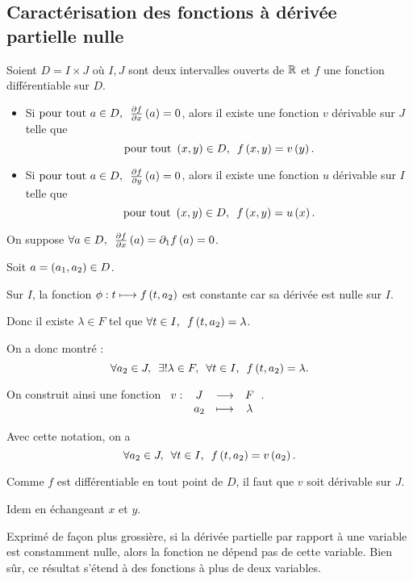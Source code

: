 \subsection{Caractérisation des fonctions à dérivée partielle nulle}

\begin{prop}
Soient \(D=I\times J\) où \(I,J\) sont deux intervalles ouverts de \(\mathbb{R}\) et \(f\) une fonction différentiable sur \(D\).

\begin{itemize}
    \item Si \(\quantifs{\tpt a\in D}\pdv{f}{x}\paren{a}=0\), alors il existe une fonction \(v\) dérivable sur \(J\) telle que \[\quantifs{\tpt\paren{x,y}\in D}f\paren{x,y}=v\paren{y}.\]
    \item Si \(\quantifs{\tpt a\in D}\pdv{f}{y}\paren{a}=0\), alors il existe une fonction \(u\) dérivable sur \(I\) telle que \[\quantifs{\tpt\paren{x,y}\in D}f\paren{x,y}=u\paren{x}.\]
\end{itemize}
\end{prop}

\begin{dem}
On suppose \(\quantifs{\forall a\in D}\pdv{f}{x}\paren{a}=\pdif{1}f\paren{a}=0\).

Soit \(a=\left(a_1,a_2\right)\in D\).

Sur \(I\), la fonction \(\phi:t\longmapsto f\left(t,a_2\right)\) est constante car sa dérivée est nulle sur \(I\).

Donc il existe \(\lambda\in F\) tel que \(\quantifs{\forall t\in I}f\paren{t,a_2}=\lambda\).

On a donc montré : \[\quantifs{\forall a_2\in J;\exists!\lambda\in F;\forall t\in I}f\paren{t,a_2}=\lambda.\]

On construit ainsi une fonction \(\begin{array}[t]{cccc}v : & J & \longrightarrow & F \\ & a_2 & \longmapsto & \lambda\end{array}\).

Avec cette notation, on a \[\quantifs{\forall a_2\in J;\forall t\in I}f\paren{t,a_2}=v\paren{a_2}.\]

Comme \(f\) est différentiable en tout point de \(D\), il faut que \(v\) soit dérivable sur \(J\).

Idem en échangeant \(x\) et \(y\).
\end{dem}

Exprimé de façon plus grossière, si la dérivée partielle par rapport à une variable est constamment nulle, alors la fonction ne dépend pas de cette variable. Bien sûr, ce résultat s'étend à des fonctions à plus de deux variables.

